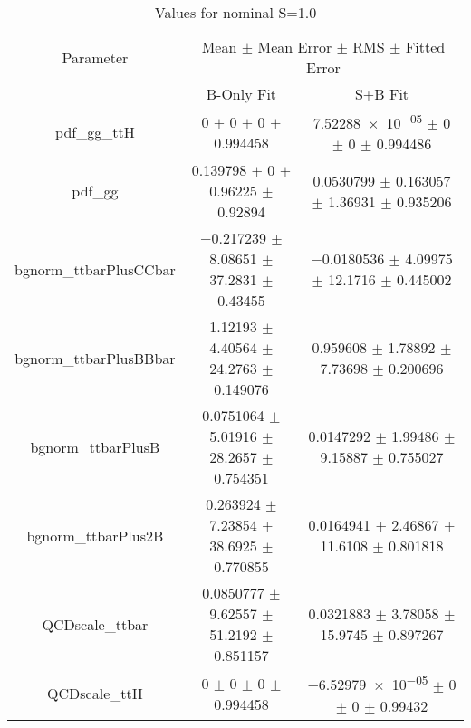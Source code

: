 \begin{table}
\centering
\caption{Values for nominal S=1.0}
\begin{tabular}{ccc}
\toprule
Parameter & \multicolumn{2}{c}{Mean $\pm$ Mean Error $\pm$ RMS $\pm$ Fitted Error}\\
 & B-Only Fit & S+B Fit\\
\midrule
pdf\_gg\_ttH & \num{0} $\pm$ \num{0} $\pm$ \num{0} $\pm$ \num{0.994458} & \num{7.52288e-05} $\pm$ \num{0} $\pm$ \num{0} $\pm$ \num{0.994486}\\
pdf\_gg & \num{0.139798} $\pm$ \num{0} $\pm$ \num{0.96225} $\pm$ \num{0.92894} & \num{0.0530799} $\pm$ \num{0.163057} $\pm$ \num{1.36931} $\pm$ \num{0.935206}\\
bgnorm\_ttbarPlusCCbar & \num{-0.217239} $\pm$ \num{8.08651} $\pm$ \num{37.2831} $\pm$ \num{0.43455} & \num{-0.0180536} $\pm$ \num{4.09975} $\pm$ \num{12.1716} $\pm$ \num{0.445002}\\
bgnorm\_ttbarPlusBBbar & \num{1.12193} $\pm$ \num{4.40564} $\pm$ \num{24.2763} $\pm$ \num{0.149076} & \num{0.959608} $\pm$ \num{1.78892} $\pm$ \num{7.73698} $\pm$ \num{0.200696}\\
bgnorm\_ttbarPlusB & \num{0.0751064} $\pm$ \num{5.01916} $\pm$ \num{28.2657} $\pm$ \num{0.754351} & \num{0.0147292} $\pm$ \num{1.99486} $\pm$ \num{9.15887} $\pm$ \num{0.755027}\\
bgnorm\_ttbarPlus2B & \num{0.263924} $\pm$ \num{7.23854} $\pm$ \num{38.6925} $\pm$ \num{0.770855} & \num{0.0164941} $\pm$ \num{2.46867} $\pm$ \num{11.6108} $\pm$ \num{0.801818}\\
QCDscale\_ttbar & \num{0.0850777} $\pm$ \num{9.62557} $\pm$ \num{51.2192} $\pm$ \num{0.851157} & \num{0.0321883} $\pm$ \num{3.78058} $\pm$ \num{15.9745} $\pm$ \num{0.897267}\\
QCDscale\_ttH & \num{0} $\pm$ \num{0} $\pm$ \num{0} $\pm$ \num{0.994458} & \num{-6.52979e-05} $\pm$ \num{0} $\pm$ \num{0} $\pm$ \num{0.99432}\\
\bottomrule
\end{tabular}
\end{table}